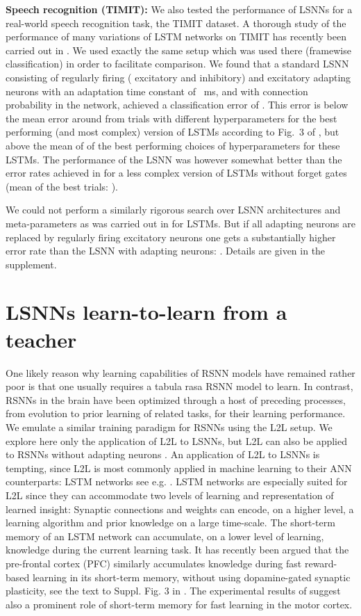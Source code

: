 \documentclass{article} \pdfoutput=1
\begin{document}
\textbf{Speech recognition (TIMIT):}
We also tested the performance of LSNNs for a real-world speech recognition task, the TIMIT dataset.
A thorough study of the performance of many variations of LSTM networks on TIMIT has recently been carried out in \cite{greff2017lstm}.
We used exactly the same setup which was used there (framewise classification) in order to facilitate comparison.
We found that a standard LSNN consisting of  regularly firing ( excitatory and  inhibitory) and  excitatory adapting neurons with an adaptation time constant of ~ms, and
with  connection probability in the network, achieved a classification error of .
This error is below the mean error around  from  trials with different hyperparameters for the best performing (and most complex)
version of LSTMs according to Fig.~3 of \cite{greff2017lstm}, but above the mean of  of the  best performing choices of hyperparameters for these LSTMs.
The performance of the LSNN was however somewhat better than the error rates achieved in \cite{greff2017lstm} for a less complex version of LSTMs without forget gates (mean of the best  trials: ).

We could not perform a similarly rigorous search over LSNN architectures and meta-parameters as was carried out in \cite{greff2017lstm} for LSTMs.
But if all adapting neurons are replaced by regularly firing excitatory neurons one gets a substantially higher error rate than the LSNN with adapting neurons: . Details are given in the supplement.

\section{LSNNs learn-to-learn from a teacher}\label{sec:L2L}

One likely reason why learning capabilities of RSNN models have remained rather poor is that one usually requires a tabula rasa RSNN model to learn.
In contrast, RSNNs in the brain have been optimized through a host of preceding processes, from evolution to prior learning of related tasks, for their learning performance. 
We emulate a similar training paradigm for RSNNs using the L2L setup.
We explore here only the application of L2L to LSNNs, but L2L can also be applied to RSNNs without adapting neurons \cite{subramoney_etal_2018}.
An application of L2L to LSNNs is tempting, since L2L is most commonly applied in machine learning to their ANN counterparts: LSTM networks
see e.g. \cite{wang2016learning,duan2016rl}.
LSTM networks are especially suited for L2L since they can accommodate two levels of learning and representation of learned insight: Synaptic connections and weights can encode, on a higher level, a learning algorithm and prior knowledge on a large time-scale.
The short-term memory of an LSTM network can accumulate, on a lower level of learning, knowledge during the current learning task.
It has recently been argued \cite{WangETAL:18} that the pre-frontal cortex (PFC) similarly accumulates knowledge during fast reward-based learning in its short-term memory, without using dopamine-gated synaptic plasticity, see the text to Suppl. Fig. 3 in \cite{WangETAL:18}. The experimental results of \cite{perich2018neural} suggest also a prominent role of short-term memory for fast learning in the motor cortex.
\end{document}
